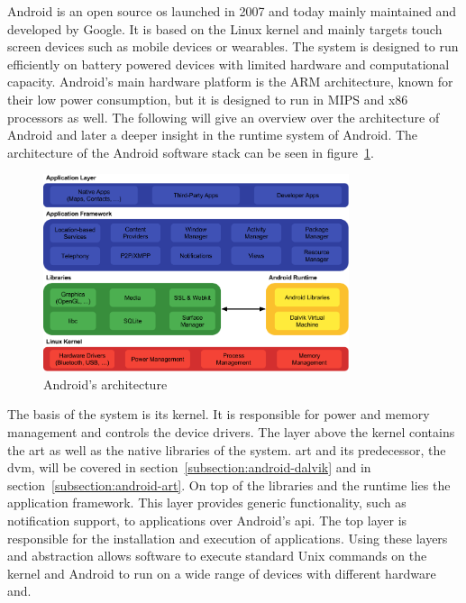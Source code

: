 Android is an open source \gls{os} launched in 2007 and today mainly maintained and developed by Google.
It is based on the Linux kernel and mainly targets touch screen devices such as mobile devices or wearables.
The system is designed to run efficiently on battery powered devices with limited hardware and computational capacity.
Android's main hardware platform is the ARM architecture, known for their low power consumption, but it is designed to run in MIPS and x86 processors as well.
The following will give an overview over the architecture of Android and later a deeper insight in the runtime system of Android.
The architecture of the Android software stack can be seen in figure~\ref{fig:androidArchitecture}.
\newline

\begin{figure}[h]
    \centering
    \includegraphics[width=0.8\textwidth]{data/stack.png}
    \caption{Android's architecture \cite{androidStack}}
    \label{fig:androidArchitecture}
\end{figure}

The basis of the system is its kernel.
It is responsible for power and memory management and controls the device drivers.
\newline
The layer above the kernel contains the \gls{art} as well as the native libraries of the system.
\gls{art} and its predecessor, the \gls{dvm}, will be covered in section~\ref{subsection:android-dalvik} and in section~\ref{subsection:android-art}.
\newline
On top of the libraries and the runtime lies the application framework.
This layer provides generic functionality, such as notification support, to applications over Android's \gls{api}.
\newline
The top layer is responsible for the installation and execution of applications.
\newline
Using these layers and abstraction allows software to execute standard Unix commands on the kernel and Android to run on a wide range of devices with different hardware and.
